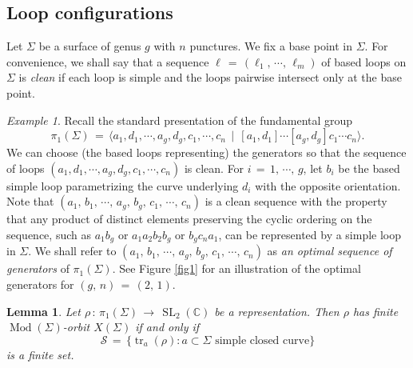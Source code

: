 \documentclass[reqno]{amsart}
\theoremstyle{plain}
\newtheorem{lemma}[theorem]{Lemma}
\theoremstyle{definition}
\theoremstyle{remark}
\newtheorem{example}[theorem]{Example}
\newcommand{\C}{{\mathbb{C}}}
\newcommand{\Scal}{{\mathcal{S}}}
\DeclareMathOperator{\Mod}{Mod}
\DeclareMathOperator{\SL}{SL}
\DeclareMathOperator{\tr}{tr}
\begin{document}
\subsection{Loop configurations} \label{sect:2.4}

Let $\Sigma$ be a surface of genus $g$ with $n$ punctures. We fix a base point in $\Sigma$. For convenience, we 
shall say that a sequence $\ell\,=\,(\ell_1,\,\cdots,\,\ell_m)$ of based loops on $\Sigma$ is \emph{clean} if each loop 
is simple and the loops pairwise intersect only at the base point.

\begin{example}
\label{exgen}
Recall the standard presentation of the fundamental group
$$\pi_1(\Sigma)\,=\,\langle a_1,d_1,\cdots,a_g,d_g,c_1,\cdots,c_n\,
\mid\,[a_1,d_1]\cdots[a_g,d_g]c_1\cdots c_n\rangle.$$
We can choose (the based loops representing) the generators so that the sequence of loops
$(a_1,d_1,\cdots,a_g,d_g,c_1,\cdots,c_n)$ is clean. For $i\,=\,1,\,\cdots,\,g$, let $b_i$ be the based simple
loop parametrizing the curve underlying $d_i$ with the opposite orientation. Note that
$(a_1,\,b_1,\,\cdots,\,a_g,\,b_g,\,c_1,\,\cdots,\,c_n)$ is a clean sequence with the property that any product of
distinct elements preserving the cyclic ordering on the sequence, such as $a_1b_g$ or $a_1a_2b_2b_g$ or
$b_gc_na_1$, can be represented by a simple loop in $\Sigma$. We shall refer to
$(a_1,\,b_1,\,\cdots,\,a_g,\,b_g,\,c_1,\,\cdots,\,c_n)$ as \emph{an optimal sequence of generators} of
$\pi_1(\Sigma)$. See Figure \ref{fig1} for an illustration of the optimal generators for $(g,\,n)\,=\,(2,\,1)$.
\end{example}

\begin{lemma}\label{simplefinitelem}
Let $\rho\,:\,\pi_1(\Sigma)\,\to\,\SL_2(\C)$ be a representation. Then $\rho$ has finite $\Mod(\Sigma)$-orbit
$X(\Sigma)$ if and only if
$$\Scal\,=\,\{\tr_a(\rho):\text{$a\subset\Sigma$ simple closed curve}\}$$
is a finite set.
\end{lemma}
\end{document}
